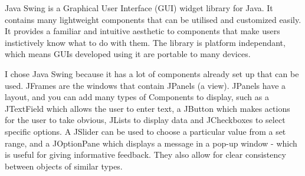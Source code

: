 Java Swing \cite{java_swing_2020} is a Graphical User Interface (GUI) widget library for Java. It contains many lightweight components that can be utilised and customized easily. It provides a familiar and intuitive aesthetic to components that make users instictively know what to do with them. The library is platform independant, which means GUIs developed using it are portable to many devices.

I chose Java Swing because it has a lot of components already set up that can be used. JFrames are the windows that contain JPanels (a view). JPanels have a layout, and you can add many types of Components to display, such as a JTextField which allows the user to enter text, a JButton which makes actions for the user to take obvious, JLists to display data and JCheckboxes to select specific options. A JSlider can be used to choose a particular value from a set range, and a JOptionPane which displays a message in a pop-up window - which is useful for giving informative feedback. They also allow for clear consistency between objects of similar types.

